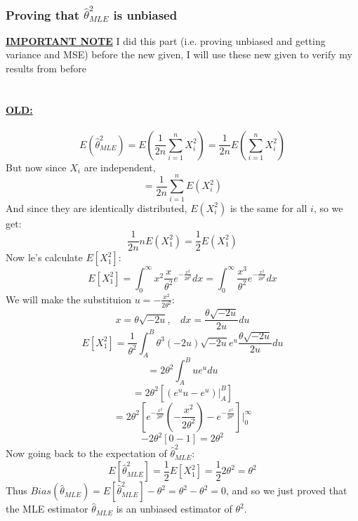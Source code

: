 \documentclass[12pt]{article}
\begin{document}
\subsubsection*{Proving that $\hat{\theta}^2_{MLE}$ is unbiased}
\textbf{\underline{IMPORTANT NOTE}}
I did this part (i.e. proving unbiased and getting variance and MSE) before the new given, I will use these new given to verify my results from before \\ \\ \\
\textbf{\underline{OLD:}}\\ \\
\[
  E(\hat{\theta}^2_{MLE}) = E(\frac{1}{2n} \sum_{i=1}^{n} X_i^2) = \frac{1}{2n} E(\sum_{i=1}^{n} X_i^2)
\]
But now since $X_i$ are independent,
\[
  = \frac{1}{2n} \sum_{i=1}^{n} E(X_i^2)
\]
And since they are identically distributed, $E(X_i^2)$ is the same for all $i$, so we get:
\[
  \frac{1}{2n}n E(X_1^2) = \frac{1}{2} E(X_1^2)
\]
Now le's calculate $E[X_1^2]$:
\[
  E[X_1^2] = \int_{0}^{\infty} x^2\frac{x}{\theta^2}e^{-\frac{x^2}{2\theta^2}} dx = \int_{0}^{\infty} \frac{x^3}{\theta^2}e^{-\frac{x^2}{2\theta^2}} dx
\]
We will make the substituion $u = -\frac{x^2}{2\theta^2}$:
\[
  x = \theta\sqrt{-2u} , \ \ \ \ dx = \frac{\theta \sqrt{-2u}}{2u} du
\]
\[
  E[X^2_1] = \frac{1}{\theta^2} \int_{A}^{B} \theta^3(-2u)\sqrt{-2u}e^u \frac{\theta\sqrt{-2u}}{2u}du
\]
\[
  =2\theta^2 \int_{A}^{B} ue^u du
\]
\[
  = 2\theta^2[(e^u u -e^u)|^B_A]
\]
\[
  = 2\theta^2[e^{-\frac{x^2}{2\theta^2}}(-\frac{x^2}{2\theta^2}) - e^{-\frac{x^2}{2\theta^2}}]|^{\infty}_{0}
\]
\[
  -2\theta^2[0-1] = 2\theta^2
\]
Now going back to the expectation of $\hat{\theta}^2_{MLE}$:
\[
  E[\hat{\theta}^2_{MLE}] = \frac{1}{2} E[X_1^2] = \frac{1}{2} 2\theta^2 = \theta^2
\]
Thus $Bias(\hat{\theta}_{MLE}) = E[\hat{\theta}^2_{MLE}] - \theta^2 = \theta^2 -\theta^2= 0$, and so we just proved that the MLE estimator $\hat{\theta}_{MLE}$ is an unbiased estimator of $\theta^2$.
\end{document}
